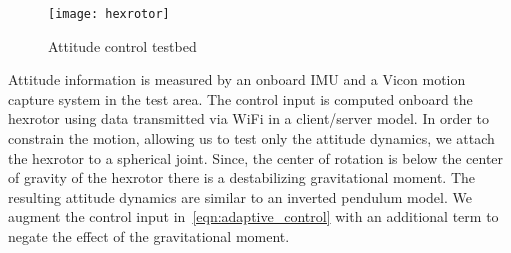\documentclass[fleqn]{IJCAS}  %
\begin{document}
\begin{multicols}{2}
\begin{figure}[H]
    \centering
    \texttt{[image: hexrotor]}
    \caption{Attitude control testbed~\label{fig:hexrotor}}
\end{figure}
Attitude information is measured by an onboard IMU and a Vicon motion capture system in the test area.
The control input is computed onboard the hexrotor using data transmitted via WiFi in a client/server model.
In order to constrain the motion, allowing us to test only the attitude dynamics, we attach the hexrotor to a spherical joint.
Since, the center of rotation is below the center of gravity of the hexrotor there is a destabilizing gravitational moment.
The resulting attitude dynamics are similar to an inverted pendulum model.
We augment the control input in~\cref{eqn:adaptive_control} with an additional term to negate the effect of the gravitational moment.


\end{multicols}
\end{document}
